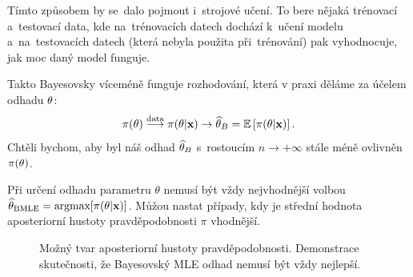 \begin{remark}
	Tímto způsobem by se~dalo pojmout i~strojové učení. To bere nějaká trénovací a~testovací data, kde na~trénovacích datech dochází k~učení modelu a~na~testovacích datech (která nebyla použita při~trénování) pak vyhodnocuje, jak moc daný model funguje.
\end{remark}
Takto Bayesovsky víceméně funguje rozhodování, která v praxi děláme za účelem odhadu $\theta$: 
$$ \pi(\theta)\stackrel{\text{data}}{\longrightarrow}\pi(\theta|\textbf{x})\to \widehat{\theta}_B=\mathbb{E}\left[ \pi(\theta|\textbf{x}) \right].$$
Chtěli bychom, aby byl náš odhad $\widehat{\theta}_B$ s~rostoucím $n\to+\infty$ stále méně ovlivněn $\pi(\theta)$.
\begin{remark}
Při určení odhadu parametru $ \theta $ nemusí být vždy nejvhodnější volbou $ \widehat{\theta}_{\text{BMLE}} = \text{argmax}[\pi(\theta|\textbf{x})]$. Můžou nastat případy, kdy je střední hodnota aposteriorní hustoty pravděpodobnosti $ \pi $ vhodnější.
\begin{figure}[h]
	\centering    
	\caption{Možný tvar aposteriorní hustoty pravděpodobnosti. Demonstrace skutečnosti, že Bayesovský MLE odhad nemusí být vždy nejlepší.}
\end{figure}
\end{remark}



